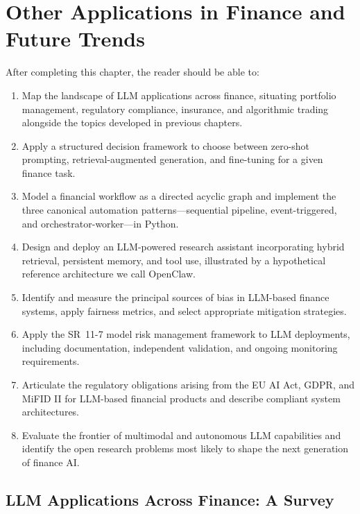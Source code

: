 \chapter{Other Applications in Finance and Future Trends}
\label{ch:applications-future}

\begin{remark}
After completing this chapter, the reader should be able to:
\begin{enumerate}
  \item Map the landscape of LLM applications across finance, situating portfolio management,
        regulatory compliance, insurance, and algorithmic trading alongside the topics
        developed in previous chapters.
  \item Apply a structured decision framework to choose between zero-shot prompting,
        retrieval-augmented generation, and fine-tuning for a given finance task.
  \item Model a financial workflow as a directed acyclic graph and implement the three
        canonical automation patterns---sequential pipeline, event-triggered, and
        orchestrator-worker---in Python.
  \item Design and deploy an LLM-powered research assistant incorporating hybrid retrieval,
        persistent memory, and tool use, illustrated by a hypothetical reference
        architecture we call OpenClaw.
  \item Identify and measure the principal sources of bias in LLM-based finance systems,
        apply fairness metrics, and select appropriate mitigation strategies.
  \item Apply the SR~11-7 model risk management framework to LLM deployments, including
        documentation, independent validation, and ongoing monitoring requirements.
  \item Articulate the regulatory obligations arising from the EU AI Act, GDPR, and MiFID II
        for LLM-based financial products and describe compliant system architectures.
  \item Evaluate the frontier of multimodal and autonomous LLM capabilities and identify
        the open research problems most likely to shape the next generation of finance AI.
\end{enumerate}
\end{remark}


\section{LLM Applications Across Finance: A Survey}
\label{sec:af-survey}

